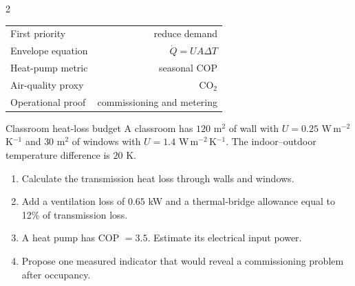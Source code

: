 \begin{multicols}{2}
\begin{keyfigures}
\begin{tabularx}{\linewidth}{@{}Xr@{}}
First priority & reduce demand\\
Envelope equation & $\dot Q=UA\Delta T$\\
Heat-pump metric & seasonal COP\\
Air-quality proxy & CO$_2$\\
Operational proof & commissioning and metering
\end{tabularx}
\end{keyfigures}

\begin{tcolorbox}[title=\sffamily\bfseries Illustrative annual energy demand,colback=white,colframe=ECOrange]
\begin{center}
\end{center}
\end{tcolorbox}

\begin{applicationexercise}{Classroom heat-loss budget}
A classroom has $120$ m$^2$ of wall with $U=0.25$ W\,m$^{-2}$\,K$^{-1}$ and $30$ m$^2$ of windows with
$U=1.4$ W\,m$^{-2}$\,K$^{-1}$. The indoor--outdoor temperature difference is $20$ K.
\begin{enumerate}
\item Calculate the transmission heat loss through walls and windows.
\item Add a ventilation loss of $0.65$ kW and a thermal-bridge allowance equal to 12\% of transmission loss.
\item A heat pump has COP $=3.5$. Estimate its electrical input power.
\item Propose one measured indicator that would reveal a commissioning problem after occupancy.
\end{enumerate}
\end{applicationexercise}


\end{multicols}
